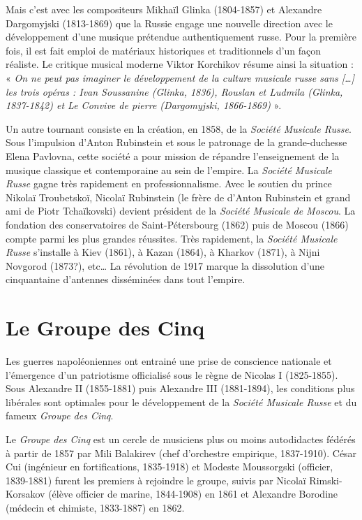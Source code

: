 Mais c'est avec les compositeurs Mikhaïl Glinka (1804-1857) et Alexandre Dargomyjski (1813-1869) que la Russie engage une nouvelle direction avec le développement d'une musique prétendue authentiquement russe. Pour la première fois, il est fait emploi de matériaux historiques et traditionnels d'un façon réaliste. Le critique musical moderne Viktor Korchikov résume ainsi la situation :\\
« \emph{On ne peut pas imaginer le développement de la culture musicale russe sans [\dots] les trois opéras : \emph{Ivan Soussanine} (Glinka, 1836), \emph{Rouslan et Ludmila} (Glinka, 1837-1842) et \emph{Le Convive de pierre} (Dargomyjski, 1866-1869)} ».

Un autre tournant consiste en la création, en 1858, de la \emph{Société Musicale Russe}. Sous l'impulsion d'Anton Rubinstein et sous le patronage de la grande-duchesse Elena Pavlovna, cette société a pour mission de répandre l'enseignement de la musique classique et contemporaine au sein de l'empire. La \emph{Société Musicale Russe} gagne très rapidement en professionnalisme. Avec le soutien du prince Nikolaï Troubetskoï, Nicolaï Rubinstein (le frère de d'Anton Rubinstein et grand ami de Piotr Tchaïkovski) devient président de la \emph{Société Musicale de Moscou}. La fondation des conservatoires de Saint-Pétersbourg (1862) puis de Moscou (1866) compte parmi les plus grandes réussites. Très rapidement, la \emph{Société Musicale Russe} s'installe à Kiev (1861), à Kazan (1864), à Kharkov (1871), à Nijni Novgorod (1873?), etc\dots{} La révolution de 1917 marque la dissolution d'une cinquantaine d'antennes disséminées dans tout l'empire. 

\section{Le Groupe des Cinq}

Les guerres napoléoniennes ont entrainé une prise de conscience nationale et l’émergence d'un patriotisme officialisé sous le règne de Nicolas I\ier{} (1825-1855).  Sous Alexandre II (1855-1881) puis Alexandre III (1881-1894), les conditions plus libérales sont optimales pour le développement de la \emph{Société Musicale Russe} et du fameux \emph{Groupe des Cinq}.

Le \emph{Groupe des Cinq} est un cercle de musiciens plus ou moins autodidactes fédérés à partir de 1857 par Mili Balakirev (chef d'orchestre empirique, 1837-1910). César Cui (ingénieur en fortifications, 1835-1918) et Modeste Moussorgski (officier, 1839-1881) furent les premiers à rejoindre le groupe, suivis par Nicolaï Rimski-Korsakov (élève officier de marine, 1844-1908) en 1861 et Alexandre Borodine (médecin et chimiste, 1833-1887) en 1862.

